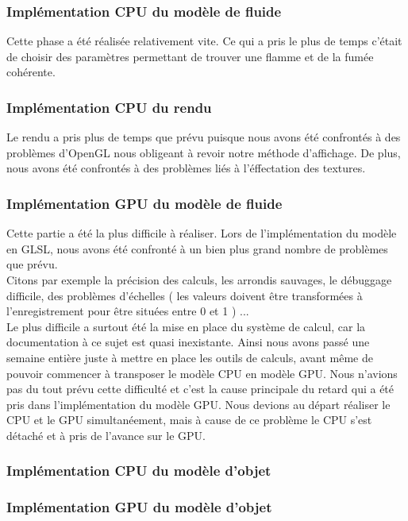 \documentclass[a4paper,10pt]{article}
\begin{document}
\subsubsection{Implémentation CPU du modèle de fluide}
Cette phase a été réalisée relativement vite. Ce qui a pris le plus de temps c'était de choisir des paramètres
permettant de trouver une flamme et de la fumée cohérente.

\subsubsection{Implémentation CPU du rendu}
Le rendu a pris plus de temps que prévu puisque nous avons été confrontés à des problèmes d'OpenGL nous obligeant à revoir 
notre méthode d'affichage. De plus, nous avons été confrontés à des problèmes liés à l'éffectation des textures. 


\subsubsection{Implémentation GPU du modèle de fluide}
Cette partie a été la plus difficile à réaliser. Lors de l'implémentation du modèle en GLSL, nous avons été
confronté à un bien plus grand nombre de problèmes que prévu. \\
Citons par exemple la précision des calculs, les arrondis sauvages, le débuggage difficile, des problèmes d'échelles ( les valeurs doivent être transformées à l'enregistrement pour être situées entre 0 et 1 ) ...\\
Le plus difficile a surtout été la mise en place du système de calcul, car la documentation à ce sujet est quasi inexistante. Ainsi nous avons passé une semaine entière juste à mettre en place les outils de calculs, avant même de pouvoir commencer à transposer le modèle CPU en modèle GPU. Nous n'avions pas du tout prévu cette difficulté et c'est la cause principale du retard qui a été pris dans l'implémentation du modèle GPU. Nous devions au départ réaliser le CPU et le GPU simultanéement,
mais à cause de ce problème le CPU s'est détaché et à pris de l'avance sur le GPU.



\subsubsection{Implémentation CPU du modèle d'objet}


\subsubsection{Implémentation GPU du modèle d'objet}
\end{document}
